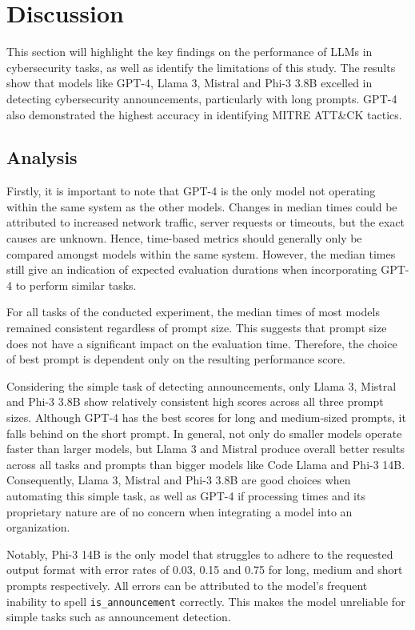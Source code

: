 \section{Discussion}
\label{sec:discussion}

This section will highlight the key findings on the performance of LLMs in cybersecurity tasks, as well as identify
the limitations of this study.
The results show that models like GPT-4, Llama 3, Mistral and Phi-3 3.8B excelled in detecting cybersecurity
announcements, particularly with long prompts.
GPT-4 also demonstrated the highest accuracy in identifying MITRE ATT\&CK tactics.

\subsection{Analysis}
\label{subsec:analysis}

Firstly, it is important to note that GPT-4 is the only model not operating within the same system as the other models.
Changes in median times could be attributed to increased network traffic, server requests or timeouts, but the exact
causes are unknown.
Hence, time-based metrics should generally only be compared amongst models within the same system.
However, the median times still give an indication of expected evaluation durations when incorporating GPT-4 to perform
similar tasks.
%

For all tasks of the conducted experiment, the median times of most models remained consistent regardless of prompt
size.
This suggests that prompt size does not have a significant impact on the evaluation time.
Therefore, the choice of best prompt is dependent only on the resulting performance score.

Considering the simple task of detecting announcements, only Llama 3, Mistral and Phi-3 3.8B show relatively consistent
high scores across all three prompt sizes.
Although GPT-4 has the best scores for long and medium-sized prompts, it falls behind on the short prompt.
In general, not only do smaller models operate faster than larger models, but Llama 3 and Mistral produce overall better
results across all tasks and prompts than bigger models like Code Llama and Phi-3 14B\@.
Consequently, Llama 3, Mistral and Phi-3 3.8B are good choices when automating this simple task, as well as GPT-4 if
processing times and its proprietary nature are of no concern when integrating a model into an organization.

Notably, Phi-3 14B is the only model that struggles to adhere to the requested output format with error rates of 0.03,
0.15 and 0.75 for long, medium and short prompts respectively.
All errors can be attributed to the model's frequent inability to spell \texttt{is\_announcement} correctly.
This makes the model unreliable for simple tasks such as announcement detection.
%

